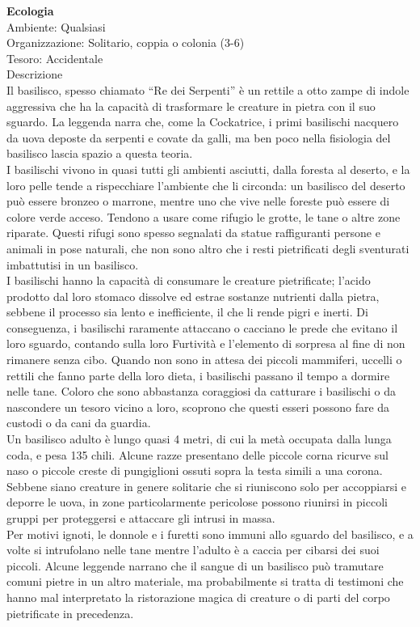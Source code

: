\begin{multicols}{2}
\textbf{Ecologia}\\
Ambiente: Qualsiasi\\
Organizzazione: Solitario, coppia o colonia (3-6)\\
Tesoro: Accidentale\\
Descrizione\\
Il basilisco, spesso chiamato “Re dei Serpenti” è un rettile a otto zampe di indole aggressiva che ha la capacità di trasformare le creature in pietra con il suo sguardo. La leggenda narra che, come la Cockatrice, i primi basilischi nacquero da uova deposte da serpenti e covate da galli, ma ben poco nella fisiologia del basilisco lascia spazio a questa teoria.\\
I basilischi vivono in quasi tutti gli ambienti asciutti, dalla foresta al deserto, e la loro pelle tende a rispecchiare l'ambiente che li circonda: un basilisco del deserto può essere bronzeo o marrone, mentre uno che vive nelle foreste può essere di colore verde acceso. Tendono a usare come rifugio le grotte, le tane o altre zone riparate. Questi rifugi sono spesso segnalati da statue raffiguranti persone e animali in pose naturali, che non sono altro che i resti pietrificati degli sventurati imbattutisi in un basilisco.\\
I basilischi hanno la capacità di consumare le creature pietrificate; l'acido prodotto dal loro stomaco dissolve ed estrae sostanze nutrienti dalla pietra, sebbene il processo sia lento e inefficiente, il che li rende pigri e inerti. Di conseguenza, i basilischi raramente attaccano o cacciano le prede che evitano il loro sguardo, contando sulla loro Furtività e l'elemento di sorpresa al fine di non rimanere senza cibo. Quando non sono in attesa dei piccoli mammiferi, uccelli o rettili che fanno parte della loro dieta, i basilischi passano il tempo a dormire nelle tane. Coloro che sono abbastanza coraggiosi da catturare i basilischi o da nascondere un tesoro vicino a loro, scoprono che questi esseri possono fare da custodi o da cani da guardia.\\
Un basilisco adulto è lungo quasi 4 metri, di cui la metà occupata dalla lunga coda, e pesa 135 chili. Alcune razze presentano delle piccole corna ricurve sul naso o piccole creste di pungiglioni ossuti sopra la testa simili a una corona. Sebbene siano creature in genere solitarie che si riuniscono solo per accoppiarsi e deporre le uova, in zone particolarmente pericolose possono riunirsi in piccoli gruppi per proteggersi e attaccare gli intrusi in massa.\\
Per motivi ignoti, le donnole e i furetti sono immuni allo sguardo del basilisco, e a volte si intrufolano nelle tane mentre l'adulto è a caccia per cibarsi dei suoi piccoli. Alcune leggende narrano che il sangue di un basilisco può tramutare comuni pietre in un altro materiale, ma probabilmente si tratta di testimoni che hanno mal interpretato la ristorazione magica di creature o di parti del corpo pietrificate in precedenza.\\


\end{multicols}
